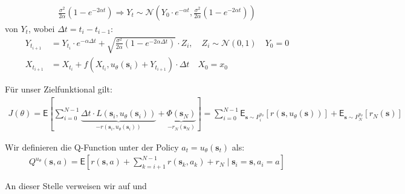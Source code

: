 \documentclass[a4paper, 12pt]{scrartcl}
\begin{document}
\begin{itemize}
{\begin{align*}
            \frac{\sigma^2}{2\alpha} (1 - e^{-2\alpha t})
            \Rightarrow
            Y_t 
            \sim
            \mathcal{N}
            \left(
                Y_0 \cdot e^{-\alpha t}, \frac{\sigma^2}{2\alpha} (1 - e^{-2\alpha t})
            \right)
        \end{align*}
    }
    von $Y_t$, wobei $\Delta t = t_{i} - t_{i-1}$:
    \begin{align*}
        Y_{t_{i+1}} 
        &=
        Y_{t_{i}} \cdot e^{-\alpha \Delta t} 
        +
        \sqrt{
            \frac{\sigma^2}{2\alpha} \left(1 - e^{-2\alpha \Delta t}\right)
        }  
        \cdot
        Z_i, 
        \quad
        Z_i
        \sim \mathcal{N}(0,1)
        \quad
        Y_0 = 0 
        \\
        X_{t_{i+1}} 
        &=
        X_{t_i} + f(X_{t_i}, u_\theta (\bm{s}_i) + Y_{t_{i+1}}) \cdot \Delta t
        \quad
        X_0 = x_0
    \end{align*}
\end{itemize}

Für unser Zielfunktional gilt:
%
\begin{align*}
    J(\theta)
    =
    \mathsf{E}
    \left[
        \sum_{i=0}^{N-1} 
        \underbrace{
            \Delta t \cdot L(\bm{s}_i, u_\theta (\bm{s}_i))
        }_{
            -r(\bm{s}_i, u_\theta (\bm{s}_i) )
        }
        + 
        \underbrace{
            \Phi(\bm{s}_N)
        }_{
            -r_N (\bm{s}_N)
        }
    \right]
    =
    \sum_{i=0}^{N-1} 
    \mathsf{E}_{\bm{s} \sim P_i^{u_\theta}} 
    \left[
        r(\bm{s}, u_\theta (\bm{s}))
    \right]
    +
    \mathsf{E}_{\bm{s} \sim P_N^{u_\theta}} 
    \left[
        r_N(\bm{s})
    \right]
\end{align*}

Wir definieren die Q-Function unter der Policy $a_t = u_{\theta}(\bm{s}_t)$ als:
%
\begin{align*}
    Q^{u_\theta}(\bm{s}, a) 
    =
    \mathsf{E}
    \left[
        r(\bm{s}, a) + \sum_{k=i+1}^{N-1} r(\bm{s}_k , a_k) + r_N 
        \mid 
        \bm{s}_i = \bm{s}, a_i = a
    \right]
\end{align*}

An dieser Stelle verweisen wir auf \cite{DPG_Silver} und \cite{lillicrap2015ddpg}
\end{document}

